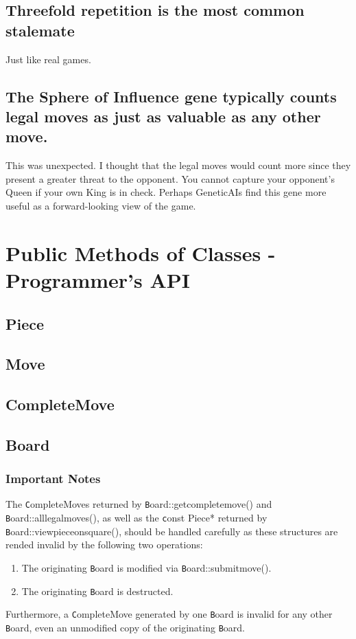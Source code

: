 \documentclass[letter]{article}
\newcommand{\code}[1]{{\texttt #1}}
\renewcommand\_{\textunderscore\allowbreak}
\begin{document}
\subsection*{Threefold repetition is the most common stalemate}

Just like real games.


\subsection*{The Sphere of Influence gene typically counts legal moves as just as valuable as any other move.}

This was unexpected. I thought that the legal moves would count more since they present a greater threat to the opponent. You cannot capture your opponent's Queen if your own King is in check. Perhaps Genetic\_AIs find this gene more useful as a forward-looking view of the game.


\section{Public Methods of Classes - Programmer's API}

\subsection{Piece}

\subsection{Move}

\subsection{Complete\_Move}

\subsection{Board}
\subsubsection{Important Notes}
The \code{Complete\_Move}s returned by \code{Board::get\_complete\_move()} and \code{Board::all\_legal\_moves()}, as well as the \code{const Piece*} returned by \code{Board::view\_piece\_on\_square()}, should be handled carefully as these structures are rended invalid by the following two operations:
\begin{enumerate}
	\item The originating \code{Board} is modified via \code{Board::submit\_move()}.
	\item The originating \code{Board} is destructed.
\end{enumerate}
Furthermore, a \code{Complete\_Move} generated by one \code{Board} is invalid for any other \code{Board}, even an unmodified copy of the originating \code{Board}.
\end{document}

